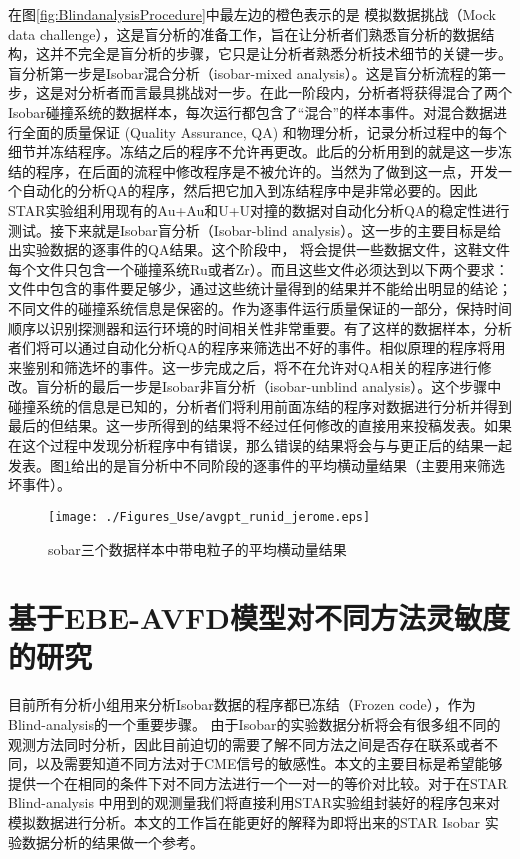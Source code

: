 在图\ref{fig:BlindanalysisProcedure}中最左边的橙色表示的是
模拟数据挑战（Mock data challenge），这是盲分析的准备工作，旨在让分析者们熟悉盲分析的数据结构，这并不完全是盲分析的步骤，它只是让分析者熟悉分析技术细节的关键一步。盲分析第一步是Isobar混合分析（isobar-mixed analysis）。这是盲分析流程的第一步，这是对分析者而言最具挑战对一步。在此一阶段内，分析者将获得混合了两个Isobar碰撞系统的数据样本，每次运行都包含了“混合”的样本事件。对混合数据进行全面的质量保证 (Quality Assurance, QA) 和物理分析，记录分析过程中的每个细节并冻结程序。冻结之后的程序不允许再更改。此后的分析用到的就是这一步冻结的程序，在后面的流程中修改程序是不被允许的。当然为了做到这一点，开发一个自动化的分析QA的程序，然后把它加入到冻结程序中是非常必要的。因此STAR实验组利用现有的Au+Au和U+U对撞的数据对自动化分析QA的稳定性进行测试。接下来就是Isobar盲分析（Isobar-blind analysis）。这一步的主要目标是给出实验数据的逐事件的QA结果。这个阶段中， 将会提供一些数据文件，这鞋文件每个文件只包含一个碰撞系统Ru或者Zr）。而且这些文件必须达到以下两个要求：文件中包含的事件要足够少，通过这些统计量得到的结果并不能给出明显的结论；不同文件的碰撞系统信息是保密的。作为逐事件运行质量保证的一部分，保持时间顺序以识别探测器和运行环境的时间相关性非常重要。有了这样的数据样本，分析者们将可以通过自动化分析QA的程序来筛选出不好的事件。相似原理的程序将用来鉴别和筛选坏的事件。这一步完成之后，将不在允许对QA相关的程序进行修改。盲分析的最后一步是Isobar非盲分析（isobar-unblind analysis）。这个步骤中碰撞系统的信息是已知的，分析者们将利用前面冻结的程序对数据进行分析并得到最后的但结果。这一步所得到的结果将不经过任何修改的直接用来投稿发表。如果在这个过程中发现分析程序中有错误，那么错误的结果将会与与更正后的结果一起发表。图\ref{fig:blindanalysispt}给出的是盲分析中不同阶段的逐事件的平均横动量结果（主要用来筛选坏事件）。

\begin{figure}[htb]
\begin{center}
\texttt{[image: ./Figures\_Use/avgpt\_runid\_jerome.eps]}
\end{center}
\caption{sobar三个数据样本中带电粒子的平均横动量结果\cite{STARBlinding}}
\label{fig:blindanalysispt}
\end{figure}



\section{基于EBE-AVFD模型对不同方法灵敏度的研究}

目前所有分析小组用来分析Isobar数据的程序都已冻结（Frozen code），作为Blind-analysis的一个重要步骤。
由于Isobar的实验数据分析将会有很多组不同的观测方法同时分析，因此目前迫切的需要了解不同方法之间是否存在联系或者不同，以及需要知道不同方法对于CME信号的敏感性。本文的主要目标是希望能够提供一个在相同的条件下对不同方法进行一个一对一的等价对比较。对于在STAR Blind-analysis 中用到的观测量我们将直接利用STAR实验组封装好的程序包来对模拟数据进行分析。本文的工作旨在能更好的解释为即将出来的STAR Isobar 实验数据分析的结果做一个参考。



